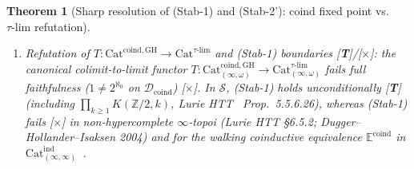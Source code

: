 \documentclass[11pt]{article}
\theoremstyle{plain}
\newtheorem{theorem}{Theorem}[section]
\theoremstyle{definition}
\newcommand{\Cat}{\mathrm{Cat}}
\begin{document}
\begin{theorem}[Sharp resolution of \textup{(Stab-1)} and \textup{(Stab-2')}: $\mathrm{coind}$ fixed point vs.\ $\tau\text{-}\mathrm{lim}$ refutation]
\begin{enumerate}[nosep,label=(\roman*)]
\item \emph{Refutation of $T : \Cat^{\mathrm{coind, GH}} \to \Cat^{\tau\text{-}\mathrm{lim}}$ and \textup{(Stab-1)} boundaries \textup{[\textbf{T}]}/[\textbf{$\times$}]}: the canonical colimit-to-limit functor $T : \Cat_{(\infty,\omega)}^{\mathrm{coind, GH}} \to \Cat_{(\infty,\omega)}^{\tau\text{-}\mathrm{lim}}$ fails full faithfulness ($1 \neq 2^{\aleph_0}$ on $\mathcal{D}_{\mathrm{coind}}$) \textup{[\textbf{$\times$}]}. In $\mathcal{S}$, \textup{(Stab-1)} holds unconditionally \textup{[\textbf{T}]} (including $\prod_{k \ge 1} K(\mathbb{Z}/2, k)$, Lurie HTT~\cite{LurieHTT} Prop.~5.5.6.26), whereas \textup{(Stab-1)} fails \textup{[\textbf{$\times$}]} in non-hypercomplete $\infty$-topoi (Lurie HTT \S 6.5.2; Dugger--Hollander--Isaksen 2004) and for the walking coinductive equivalence $\mathbb{E}^{\mathrm{coind}}$ in $\Cat_{(\infty,\infty)}^{\mathrm{ind}}$~\cite{Goldthorpe2023}.
\end{enumerate}
\end{theorem}
\end{document}
